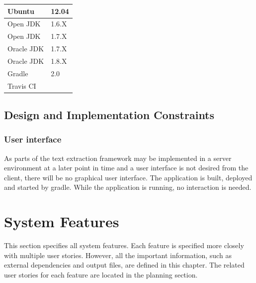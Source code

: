 \begin{tabular}{| p{3cm} | p{3cm} |}
	\hline
	Ubuntu & 12.04 \\ \hline
	Open JDK & 1.6.X  \\ \hline
	Open JDK & 1.7.X  \\ \hline
	Oracle JDK & 1.7.X \\ \hline
	Oracle JDK & 1.8.X  \\ \hline
	Gradle & 2.0 \\ \hline
	Travis CI &  \\ \hline
\end{tabular}



\subsection{Design and Implementation Constraints}

\subsubsection{User interface}
As parts of the text extraction framework may be implemented in a server environment at a later point in time and a user interface is not desired from the client, there will be no graphical user interface. The application is built, deployed and started by gradle. While the application is running, no interaction is needed. \cite{Reference1} \cite{CLEANEVAL:online}


\section{System Features}

This section specifies all system features. Each feature is specified more closely with multiple user stories. However, all the important information, such as external dependencies and output files, are defined in this chapter. The related user stories for each feature are located in the planning section.  



